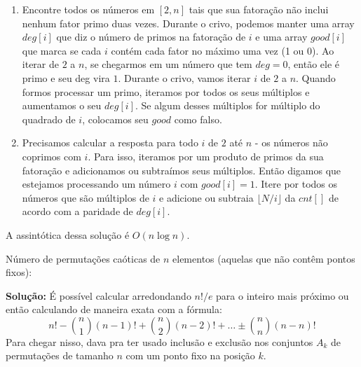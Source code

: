 \begin{enumerate}
    \item Encontre todos os números em $[2, n]$ tais que sua fatoração não inclui nenhum fator primo duas vezes. Durante o crivo, podemos manter uma array $deg[i]$ que diz o número de primos na fatoração de $i$ e uma array $good[i]$ que marca se cada $i$ contém cada fator no máximo uma vez (1 ou 0). Ao iterar de $2$ a $n$, se chegarmos em um número que tem $deg=0$, então ele é primo e seu deg vira $1$. Durante o crivo, vamos iterar $i$ de $2$ a $n$. Quando formos processar um primo, iteramos por todos os seus múltiplos e aumentamos o seu $deg[i]$. Se algum desses múltiplos for múltiplo do quadrado de $i$, colocamos seu $good$ como falso.
    \item Precisamos calcular a resposta para todo $i$ de $2$ até $n$ - os números não coprimos com $i$. Para isso, iteramos por um produto de primos da sua fatoração e adicionamos ou subtraímos seus múltiplos. Então digamos que estejamos processando um número $i$ com $good[i]=1$. Itere por todos os números que são múltiplos de $i$ e adicione ou subtraia $\lfloor N/i \rfloor$ da $cnt[]$ de acordo com a paridade de $deg[i]$.
\end{enumerate}


A assintótica dessa solução é $O(n \log n)$.

 Número de permutações caóticas de $n$ elementos (aquelas que não contêm pontos fixos):

\textbf{Solução:} É possível calcular arredondando $n!/e$ para o inteiro mais próximo ou então calculando de maneira exata com a fórmula:
$$ n! - {n \choose 1} (n-1)! + {n \choose 2} (n-2)! + \dots \pm {n \choose n} (n-n)!$$
Para chegar nisso, dava pra ter usado inclusão e exclusão nos conjuntos $A_k$ de permutações de tamanho $n$ com um ponto fixo na posição $k$.